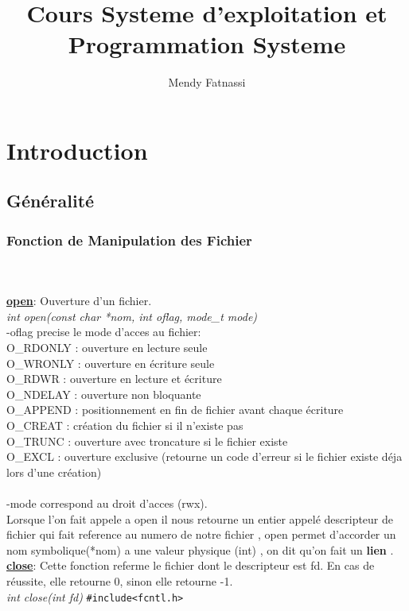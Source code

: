 \documentclass[a4paper,12pt,openany]{book}
\author{Mendy Fatnassi}
\title{Cours Systeme d'exploitation et Programmation Systeme}
\begin{document}
\maketitle
\tableofcontents

\chapter{Introduction}

\section{Généralité}

\subsection{Fonction de Manipulation des Fichier}

\\
\\
\underline{\textbf{open}}: Ouverture d'un fichier.\\
\emph{int open(const char *nom, int oflag, mode_t mode)}
\\
-oflag precise le mode d'acces au fichier:\\
O_RDONLY : ouverture en lecture seule\\
O_WRONLY : ouverture en écriture seule\\
O_RDWR : ouverture en lecture et écriture\\
O_NDELAY : ouverture non bloquante\\
O_APPEND : positionnement en fin de fichier avant chaque écriture\\
O_CREAT : création du fichier si il n'existe pas\\
O_TRUNC : ouverture avec troncature si le fichier existe\\
O_EXCL : ouverture exclusive (retourne un code d'erreur si le fichier existe déja lors d'une création)\\
\\
-mode correspond au droit d'acces (rwx).\\
Lorsque l'on fait appele a open il nous retourne un entier appelé descripteur de fichier qui fait reference au numero de notre fichier , open permet d'accorder un nom symbolique(*nom) a une valeur physique (int) , on dit qu'on fait un \textbf{lien} .\\

\underline{\textbf{close}}: Cette fonction referme le fichier dont le descripteur est fd. En cas de réussite, elle retourne 0, sinon elle retourne -1.\\
\emph{int close(int fd)} \verb+#include<fcntl.h>+ \\ 
\end{document}
